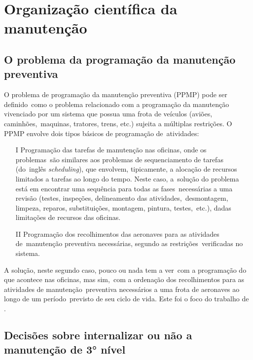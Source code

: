 \documentclass{abntex2}
\begin{document}
\begin{sloppypar}
\section{Organização científica da manutenção}


\subsection{O problema da programação da manutenção preventiva}

O problema de programação da manutenção preventiva (PPMP) pode ser definido como o problema relacionado com a programação da manutenção vivenciado por um sistema que possua uma frota de veículos (aviões, caminhões, maquinas, tratores, trens, etc.) sujeita a múltiplas restrições. O PPMP envolve dois tipos básicos de programação de atividades:

\begin{itemize}
	
	\item[I] Programação das tarefas de manutenção nas oficinas, onde os problemas são similares aos problemas de sequenciamento de tarefas (do inglês \textit{scheduling}), que envolvem, tipicamente, a alocação de recursos limitados a tarefas ao longo do tempo. Neste caso, a solução do problema está em encontrar uma sequência para todas as fases necessárias a uma revisão (testes, inspeções, delineamento das atividades, desmontagem, limpeza, reparos, substituições, montagem, pintura, testes, etc.), dadas limitações de recursos das oficinas.
	
	\item[II] Programação dos recolhimentos das aeronaves para as atividades de manutenção preventiva necessárias, segundo as restrições verificadas no sistema.
	
\end{itemize}

A solução, neste segundo caso, pouco ou nada tem a ver com a programação do que acontece nas oficinas, mas sim, com a ordenação dos recolhimentos para as atividades de manutenção preventiva necessários a uma frota de aeronaves ao longo de um período previsto de seu ciclo de vida. Este foi o foco do trabalho de  \cite{Abrahao:2006}.

\subsection{Decisões sobre internalizar ou não a manutenção de 3° nível}\


\end{sloppypar}
\end{document}
